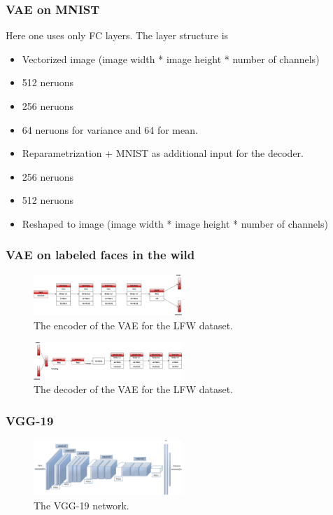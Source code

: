 \documentclass[
     11pt,         %
     a4paper,      %
     oneside,
     ]{article}
\begin{document}
\subsubsection{VAE on MNIST}
Here one uses only FC layers.
The layer structure is
\begin{itemize}
  \item Vectorized image (image width * image height * number of channels)
  \item 512 neruons
  \item 256 neruons
  \item 64 neruons for variance and 64 for mean.
  \item Reparametrization + MNIST as additional input for the decoder.
  \item 256 neruons
  \item 512 neruons
  \item Reshaped to image (image width * image height * number of channels)
\end{itemize}

\subsubsection{VAE on labeled faces in the wild}
\begin{figure}[H]
  \begin{center}
    \includegraphics[width=0.5\textwidth]{images/cifar10_encoder.png}
    \caption{The encoder of the VAE for the LFW dataset.}
  \end{center}
\end{figure}
\begin{figure}[H]
  \begin{center}
    \includegraphics[width=0.5\textwidth]{images/cifar10_decoder.png}
    \caption{The decoder of the VAE for the LFW dataset.}
  \end{center}
\end{figure}

\subsubsection{VGG-19}
\begin{figure}[H]
  \begin{center}
    \includegraphics[width=0.5\textwidth]{images/VGG19-orig.png}
    \caption{The VGG-19 network.}
  \end{center}
\end{figure}
\end{document}
